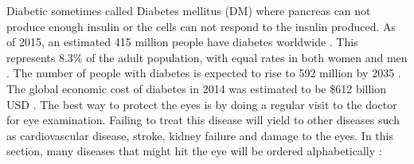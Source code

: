 Diabetic sometimes called Diabetes mellitus (DM) where pancreas can not produce enough insulin or the cells can not respond to the insulin produced.
As of 2015, an estimated 415 million people have diabetes worldwide \cite{fernandez2010obesity}.
This represents 8.3\% of the adult population, with equal rates in both women and men \cite{vos2013years}.
The number of people with diabetes is expected to rise to 592 million by 2035 \cite{beagley2014global}.
The global economic cost of diabetes in 2014 was estimated to be \$612 billion USD \cite{atlas2013international}.
The best way to protect the eyes is by doing a regular visit to the doctor for eye examination.
Failing to treat this disease will yield to other diseases such as  cardiovascular disease, stroke, kidney failure and damage to the eyes.
In this section, many diseases that might hit the eye will be ordered alphabetically :
